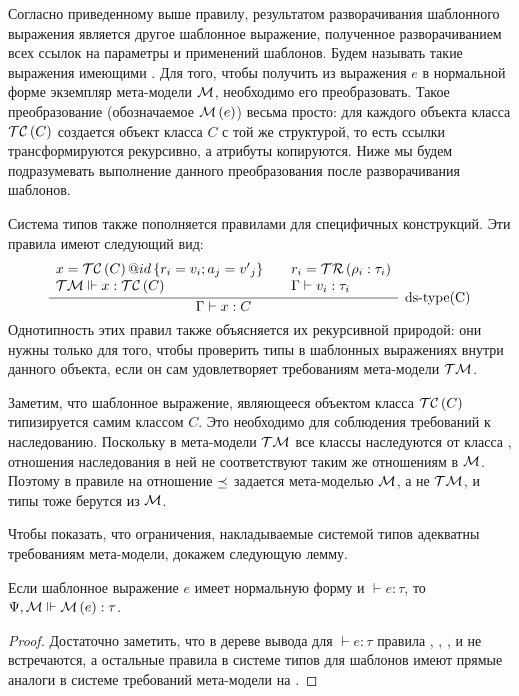 {\newcommand{\ct}[1]{\MM{M}\left(#1\right)}
Согласно приведенному выше правилу, результатом разворачивания шаблонного выражения является другое шаблонное выражение, полученное разворачиванием всех ссылок на параметры и применений шаблонов. Будем называть такие выражения имеющими . Для того, чтобы получить из выражения $e$ в нормальной форме экземпляр мета-модели $\mathcal{M}$, необходимо его преобразовать. Такое преобразование (обозначаемое $\ct{e}$) весьма просто: для каждого объекта класса $\mathcal{TC}\left(C\right)$ создается объект класса $C$ с той же структурой, то есть ссылки трансформируются рекурсивно, а атрибуты копируются. Ниже мы будем подразумевать выполнение данного преобразования после разворачивания шаблонов.

Система типов также пополняется правилами для специфичных конструкций. Эти правила имеют следующий вид:
$$
\myinfer[\mbox{ds-type(C)}]{
	\Gamma \vdash x : C
}{
	\begin{array}{l}
	x = \obj{\TC{C}}{id}{r_i = v_i; a_j = {v'}_j}\\
	\TM \Vdash x : \TC{C} 
	\end{array}	
	&
	\begin{array}{l}
	r_i = \TR{\rho_i : \tau_i}\\
	\Gamma \vdash v_i : \tau_i\\
	\end{array}	
}
$$ 
Однотипность этих правил также объясняется их рекурсивной природой: они нужны только для того, чтобы проверить типы в шаблонных выражениях внутри данного объекта, если он сам удовлетворяет требованиям мета-модели $\mathcal{TM}$.

Заметим, что шаблонное выражение, являющееся объектом класса $\mathcal{TC}\left(C\right)$ типизируется самим классом $C$. Это необходимо для соблюдения требований к наследованию. Поскольку в мета-модели $\mathcal{TM}$ все классы наследуются от класса , отношения наследования в ней не соответствуют таким же отношениям в $\mathcal{M}$. Поэтому в правиле  на  отношение $\preceq$ задается мета-моделью $\mathcal{M}$, а не $\mathcal{TM}$, и типы тоже берутся из $\mathcal{M}$. 

Чтобы показать, что ограничения, накладываемые системой типов адекватны требованиям мета-модели, докажем следующую лемму.
\begin{Lemm}\label{LemmNF}
Если шаблонное выражение $e$ имеет нормальную форму и $\vdash e : \tau$, то $\fromMM \ct{e} : \tau$.
\end{Lemm}
\begin{proof}
Достаточно заметить, что в дереве вывода для $\vdash e : \tau$ правила , , ,  и  не встречаются, а остальные правила в системе типов для шаблонов имеют прямые аналоги в системе требований мета-модели на .
\end{proof}

}
